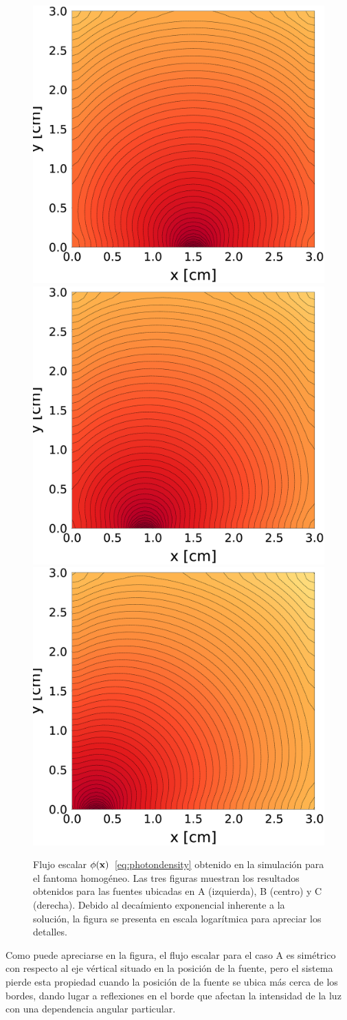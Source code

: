 \begin{figure}[h!]
\centering
  \includegraphics[width=0.32\linewidth]{figuras/ph1A.eps}
  \includegraphics[width=0.32\linewidth]{figuras/ph1B.eps}
  \includegraphics[width=0.32\linewidth]{figuras/ph1C.eps}
  \caption{
  Flujo escalar $\phi(\mathbf{x})$~\eqref{eq:photondensity} 
  obtenido en la simulación para el fantoma homogéneo. 
  Las tres figuras muestran los resultados obtenidos 
  para las fuentes ubicadas en A (izquierda), B (centro) y C (derecha). 
  Debido al decaímiento exponencial inherente a la solución, la figura se presenta en escala logarítmica para apreciar los detalles.}
\label{fig:ph1timef}
\end{figure}
Como puede apreciarse en la figura, el flujo escalar para el caso A 
es simétrico con respecto al eje vértical situado en la posición 
de la fuente, pero el sistema pierde esta propiedad cuando la 
posición de la fuente se ubica más cerca de los bordes, 
dando lugar a reflexiones en el borde que afectan la intensidad 
de la luz con una dependencia angular particular.

